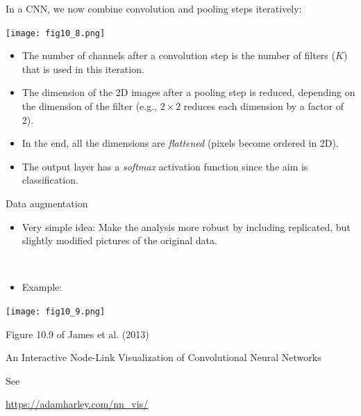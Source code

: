 \documentclass[
  10pt,
  ignorenonframetext,
  twocolumn]{beamer}
\providecommand{\tightlist}{%
  \setlength{\itemsep}{0pt}\setlength{\parskip}{0pt}}
\begin{document}
\begin{frame}
In a CNN, we now combine convolution and pooling steps iteratively:

\centering

\texttt{[image: fig10\_8.png]}

\begin{itemize}
\item
  The number of channels after a convolution step is the number of
  filters (\(K\)) that is used in this iteration.
\item
  The dimension of the 2D images after a pooling step is reduced,
  depending on the dimension of the filter (e.g., \(2\times 2\) reduces
  each dimension by a factor of 2).
\item
  In the end, all the dimensions are \emph{flattened} (pixels become
  ordered in 2D).
\item
  The output layer has a \emph{softmax} activation function since the
  aim is classification.
\end{itemize}
\end{frame}

\begin{frame}
\begin{block}{Data augmentation}
\label{data-augmentation}
\(~\)

\begin{itemize}
\tightlist
\item
  Very simple idea: Make the analysis more robust by including
  replicated, but slightly modified pictures of the original data.
\end{itemize}

\(~\)

\begin{itemize}
\tightlist
\item
  Example:
\end{itemize}

\texttt{[image: fig10\_9.png]}

\scriptsize Figure 10.9 of James et al. (2013)
\end{block}
\end{frame}

\begin{frame}
\begin{block}{An Interactive Node-Link Visualization of Convolutional
Neural Networks}
\label{an-interactive-node-link-visualization-of-convolutional-neural-networks}
\(~\)

See

\vspace{2mm}

\url{https://adamharley.com/nn_vis/}
\end{block}
\end{frame}
\end{document}
